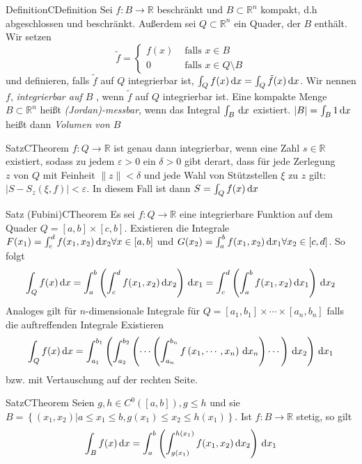 \begin{ibox}[]{Definition}{CDefinition}
    Sei $ f : B \to \mathbb{R} $ beschränkt und $ B \subset \mathbb{R}^n $ kompakt, d.h abgeschlossen und beschränkt. Außerdem sei
		$ Q \subset \mathbb{R}^n $ ein Quader, der $ B $ enthält. Wir setzen
		$$\tilde{f} = \begin{cases}
			f (x) & \text{ falls } x \in B\\
			0 & \text{ falls } x \in Q\setminus B
		\end{cases}$$
		und definieren, falls $ \tilde{f} $ auf $ Q $ integrierbar ist, $ \int_{ Q } f (x) \,\mathrm{d} x = \int_{ Q } \tilde{f} (x) \,\mathrm{d} x $.
		Wir nennen $ f $, \textit{integrierbar auf $ B $ }, wenn $ \tilde{f} $ auf $ Q $ integrierbar ist.
		Eine kompakte Menge $ B \subset \mathbb{R}^n $ heißt \textit{(Jordan)-messbar}, wenn das Integral $ \int_{ B } \,\mathrm{d} x $ 
		existiert. $ |B| = \int_{ B } 1 \,\mathrm{d} x $ heißt dann \textit{Volumen von $ B $ } 
\end{ibox}
\begin{ibox}[53]{Satz}{CTheorem}
    $ f: Q \to \mathbb{R} $ ist genau dann integrierbar, wenn eine Zahl $ s \in \mathbb{R} $ existiert, sodass zu jedem 
		$ \varepsilon > 0 \text{ ein } \delta > 0  $ gibt derart, dass für jede Zerlegung $ z \text{ von } Q $ mit Feinheit 
$ \|z \| < \delta $ und jede Wahl von Stützstellen $ \xi \text{ zu } z $ gilt: $ \left| S - S_{z} \left( \xi,f \right)  \right| <
\varepsilon$. In diesem Fall ist dann $ S = \int_{ Q } f (x) \,\mathrm{d} x $ 
\end{ibox}
\begin{ibox}[54]{Satz (Fubini)}{CTheorem}
	Es sei $ f :Q \to \mathbb{R} $ eine integrierbare Funktion auf dem Quader $ Q = [a , b] \times [c,b] $. Existieren die Integrale 
	$ F (x_1) = \int_{ c }^{ d } f (x_1,x_2) \,\mathrm{d} x_2 \forall x \in [a,b] $  und $ G (x_2) = \int_{ a }^{ b } f (x_1,x_2) \,\mathrm{d} x_1
	\forall x_2 \in [c,d]$. So folgt 
	$$ \int_{ Q } f (x) \,\mathrm{d} x = \int_{ a }^{ b } \left( \int_{ c }^{ d } f (x_1,x_2) \,\mathrm{d} x_2 \right) \,\mathrm{d} x_1 = 
	\int_{ c }^{ d } \left( \int_{ a }^{ b } f (x_1,x_2) \,\mathrm{d} x_1 \right) \,\mathrm{d} x_2$$
	Analoges gilt für $ n $-dimensionale Integrale für $ Q = [a_1,b_1] \times \cdots \times [a_n,b_n] $ falls die auftreffenden 
	Integrale Existieren
	$$ \int_{ Q } f (x) \,\mathrm{d} x = \int_{ a_1 }^{ b_1 } \left( \int_{ a_2 }^{ b_2 } \left( \cdots \left( \int_{ a_n }^{ b_n } 
	f \left( x_1, \cdots , x_n  \right)\,\mathrm{d} x_n\right)\cdots\right)\,\mathrm{d} x_2\right)\,\mathrm{d} x_1$$
bzw. mit Vertauschung auf der rechten Seite.	
\end{ibox}
\begin{ibox}[55]{Satz}{CTheorem}
	Seien $ g, h \in C^{0} ([a,b]), g \leq h  $ und sie $ B = \left\{  \left( x_1, x_2 \right) | a \leq x_1 \leq b, g (x_1)
	\leq x_2 \leq h (x_1)\right\}  $. Ist $ f : B \to \mathbb{R} $ stetig, so gilt 
	$$ \int_{ B } f (x) \,\mathrm{d} x = \int_{ a }^{ b } \left( \int_{ g (x_1) }^{ h (x_1) } f (x_1,x_2) \,\mathrm{d} x_2 \right) \,\mathrm{d} x_1 $$
\end{ibox}


